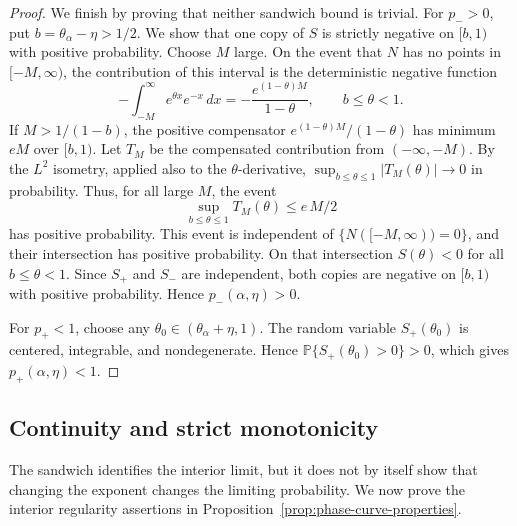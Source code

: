 \begin{proof}
We finish by proving that neither sandwich bound is trivial. For $p_->0$,
put $b=\theta_\alpha-\eta>1/2$. We show that one copy of $S$ is strictly
negative on $[b,1)$ with positive probability. Choose $M$ large. On the event
that $N$ has no points in $[-M,\infty)$, the contribution of this interval is
the deterministic negative function
\[
    -\int_{-M}^\infty e^{\theta x}e^{-x}\,dx
    =
    -\frac{e^{(1-\theta)M}}{1-\theta},
    \qquad b\le\theta<1.
\]
If $M>1/(1-b)$, the positive compensator $e^{(1-\theta)M}/(1-\theta)$ has minimum $eM$ over $[b,1)$. Let $T_M$ be the compensated contribution from $(-\infty,-M)$. By the $L^2$ isometry, applied also to the $\theta$-derivative, $\sup_{b\le\theta\le1}|T_M(\theta)|\to0$ in probability. Thus, for all large $M$, the event
\[
    \sup_{b\le\theta\le1}T_M(\theta)\le e\,M/2
\]
has positive probability. This event is independent of $\{N([-M,\infty))=0\}$, and their intersection has positive probability. On that intersection $S(\theta)<0$ for all $b\le\theta<1$. Since $S_+$ and $S_-$ are independent, both copies are negative on $[b,1)$ with positive probability. Hence $p_-(\alpha,\eta)>0$.

For $p_+<1$, choose any $\theta_0\in(\theta_\alpha+\eta,1)$.
The random variable $S_+(\theta_0)$ is centered, integrable, and nondegenerate.
Hence
$\mathbb P\{S_+(\theta_0)>0\}>0$, which gives $p_+(\alpha,\eta)<1$.
\end{proof}
\subsection{Continuity and strict monotonicity}

The sandwich identifies the interior limit, but it does not by itself show
that changing the exponent changes the limiting probability. We now prove the
interior regularity assertions in Proposition~\ref{prop:phase-curve-properties}.

